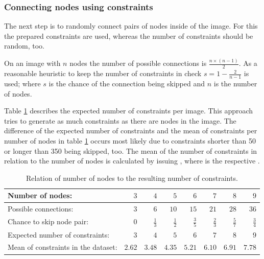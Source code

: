 
\subsubsection{Connecting nodes using constraints}

The next step is to randomly connect pairs of nodes inside of the image.
For this the prepared constraints are used, whereas the number of constraints should be random, too.

On an image with $n$ nodes the number of possible connections is $\frac{n \times (n-1)}{2}$.
As a reasonable heuristic to keep the number of constraints in check $s = 1 - \frac{2}{n-1}$ is used; where $s$ is the chance of the connection being skipped and $n$ is the number of nodes.

Table \ref{tab:relation_nodes_constraints} describes the expected number of constraints per image.
This approach tries to generate as much constraints as there are nodes in the image.
The difference of the expected number of constraints and the mean of constraints per number of nodes in table \ref{tab:relation_nodes_constraints} occurs most likely due to constraints shorter than 50 or longer than 350 being skipped, too.
The mean of the number of constraints in relation to the number of nodes is calculated by issuing , where  is the respective .

\begin{table}
\caption{Relation of number of nodes to the resulting number of constraints.}
\label{tab:relation_nodes_constraints}
\begin{tabular}{lrrrrrrr}
    \toprule
    Number of nodes: & $3$ & $4$ & $5$ & $6$ & $7$ & $8$ & $9$ \\
    \midrule
    Possible connections: & $3$ & $6$ & $10$ & $15$ & $21$ & $28$ & $36$ \\
    \midrule
    Chance to skip node pair: & $0$ & $\frac{1}{3}$ & $\frac{1}{2}$ & $\frac{3}{5}$ & $\frac{2}{3}$ & $\frac{5}{7}$ & $\frac{3}{4}$ \\
    \midrule
    Expected number of constraints: & $3$ & $4$ & $5$ & $6$ & $7$ & $8$ & $9$ \\
    \midrule
    Mean of constraints in the dataset: & $2.62$ & $3.48$ & $4.35$ & $5.21$ & $6.10$ & $6.91$ & $7.78$ \\
    \bottomrule
\end{tabular}
\end{table}

